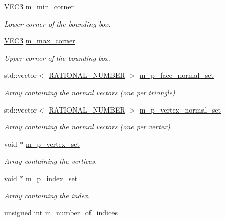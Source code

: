 \begin{DoxyCompactItemize}
\hyperlink{class_math_1_1_vec3}{VEC3} \hyperlink{class_graphics_1_1_triangle_mesh_a0ec9a88bde30813c632178b5cbb4c3e5}{m\_\-min\_\-corner}
\begin{DoxyCompactList}\small\item\em Lower corner of the bounding box. \end{DoxyCompactList}\item 
\hyperlink{class_math_1_1_vec3}{VEC3} \hyperlink{class_graphics_1_1_triangle_mesh_a7b30119057f7194dc47925bcd4489e0a}{m\_\-max\_\-corner}
\begin{DoxyCompactList}\small\item\em Upper corner of the bounding box. \end{DoxyCompactList}\item 
std::vector$<$ \hyperlink{namespace_utilities_a40969b96bd8d847b962e297cb79f08ce}{RATIONAL\_\-NUMBER} $>$ \hyperlink{class_graphics_1_1_triangle_mesh_aa76c71675a25c5b58e40afcf2625f2c1}{m\_\-p\_\-face\_\-normal\_\-set}
\begin{DoxyCompactList}\small\item\em Array containing the normal vectors (one per triangle) \end{DoxyCompactList}\item 
std::vector$<$ \hyperlink{namespace_utilities_a40969b96bd8d847b962e297cb79f08ce}{RATIONAL\_\-NUMBER} $>$ \hyperlink{class_graphics_1_1_triangle_mesh_acd89938378236b129fc2f3700103084b}{m\_\-p\_\-vertex\_\-normal\_\-set}
\begin{DoxyCompactList}\small\item\em Array containing the normal vectors (one per vertex) \end{DoxyCompactList}\item 
void $\ast$ \hyperlink{class_graphics_1_1_triangle_mesh_af59f4953488d1e569ae0fb9d4a03aaff}{m\_\-p\_\-vertex\_\-set}
\begin{DoxyCompactList}\small\item\em Array containing the vertices. \end{DoxyCompactList}\item 
void $\ast$ \hyperlink{class_graphics_1_1_triangle_mesh_a41ed5fe89584f78a2798e663dd215ce5}{m\_\-p\_\-index\_\-set}
\begin{DoxyCompactList}\small\item\em Array containing the index. \end{DoxyCompactList}\item 
unsigned int \hyperlink{class_graphics_1_1_triangle_mesh_ac778bb8fb96f1ab20315e02c1d46f7ae}{m\_\-number\_\-of\_\-indices}

\end{DoxyCompactItemize}
